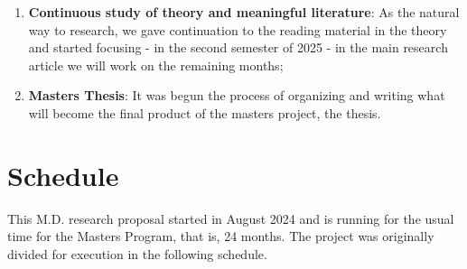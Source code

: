 \documentclass[12pt]{report}
\begin{document}
\begin{enumerate}
	\item \textbf{Continuous study of theory and meaningful literature}: As the natural way to research, we gave continuation to the reading material in the theory and started focusing -  in the second semester of 2025 - in the main research article \cite{Byun_2023} we will work on the remaining months;
		
	\item \textbf{Masters Thesis}: It was begun the process of organizing and writing what will become the final product of the masters project, the thesis.
	
\end{enumerate}

\section{Schedule}


This M.D. research proposal started in August 2024 and is running for the usual time for the Masters Program, that is, 24 months. The project was originally divided for execution in the following schedule.
\end{document}
